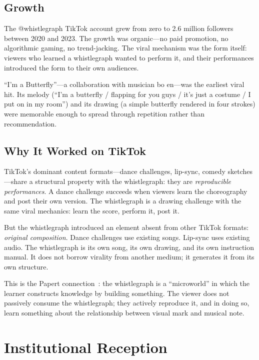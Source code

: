 \documentclass[10pt,letterpaper,twocolumn]{article}
\begin{document}
\subsection{Growth}

The @whistlegraph TikTok account grew from zero to 2.6 million followers between 2020 and 2023. The growth was organic---no paid promotion, no algorithmic gaming, no trend-jacking. The viral mechanism was the form itself: viewers who learned a whistlegraph wanted to perform it, and their performances introduced the form to their own audiences.

``I'm a Butterfly''---a collaboration with musician bo en---was the earliest viral hit. Its melody (``I'm a butterfly / flapping for you guys / it's just a costume / I put on in my room'') and its drawing (a simple butterfly rendered in four strokes) were memorable enough to spread through repetition rather than recommendation.

\subsection{Why It Worked on TikTok}

TikTok's dominant content formats---dance challenges, lip-sync, comedy sketches---share a structural property with the whistlegraph: they are \emph{reproducible performances}. A dance challenge succeeds when viewers learn the choreography and post their own version. The whistlegraph is a drawing challenge with the same viral mechanics: learn the score, perform it, post it.

But the whistlegraph introduced an element absent from other TikTok formats: \emph{original composition}. Dance challenges use existing songs. Lip-sync uses existing audio. The whistlegraph is its own song, its own drawing, and its own instruction manual. It does not borrow virality from another medium; it generates it from its own structure.

This is the Papert connection~\citep{papert1980mindstorms}: the whistlegraph is a ``microworld'' in which the learner constructs knowledge by building something. The viewer does not passively consume the whistlegraph; they actively reproduce it, and in doing so, learn something about the relationship between visual mark and musical note.

\section{Institutional Reception}
\end{document}
